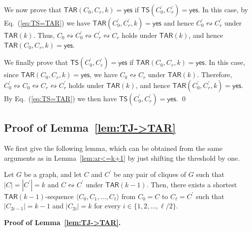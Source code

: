\documentclass{llncs}
\newcommand{\sevstep}{\leftrightsquigarrow}
\newcommand{\TAR}[1]{\mathsf{TAR}(#1)}
\newcommand{\ini}{0}
\newcommand{\tar}{r}
\newcommand{\cliq}{C}
\newcommand{\YES}{\mathsf{yes}}
\newcommand{\TARins}[3]{\mathsf{TAR}(#1,#2,#3)}
\newcommand{\TSins}[2]{\mathsf{TS}(#1,#2)}
\newcounter{one}
\begin{document}
	We now prove that $\TARins{\cliq_{\ini}}{\cliq_{\tar}}{k} = \YES$ if $\TSins{\cliq_{\ini}^\prime}{\cliq_{\tar}^\prime} = \YES$.
	In this case, by Eq.~(\ref{eq:TS=TAR}) we have $\TARins{\cliq_{\ini}^\prime}{\cliq_{\tar}^\prime}{k} = \YES$ and hence $\cliq_{\ini}^\prime \sevstep \cliq_{\tar}^\prime$ under $\TAR{k}$.
	Thus, $\cliq_{\ini} \sevstep \cliq_{\ini}^\prime \sevstep \cliq_{\tar}^\prime \sevstep \cliq_{\tar}$ holds under $\TAR{k}$, and hence $\TARins{\cliq_{\ini}}{\cliq_{\tar}}{k} = \YES$. 
	
	We finally prove that $\TSins{\cliq_{\ini}^\prime}{\cliq_{\tar}^\prime} = \YES$ if $\TARins{\cliq_{\ini}}{\cliq_{\tar}}{k} = \YES$.
	In this case, since $\TARins{\cliq_{\ini}}{\cliq_{\tar}}{k} = \YES$, we have $\cliq_{\ini} \sevstep \cliq_{\tar}$ under $\TAR{k}$.
	Therefore, $\cliq_{\ini}^\prime \sevstep \cliq_{\ini} \sevstep \cliq_{\tar} \sevstep \cliq_{\tar}^\prime$ holds under $\TAR{k}$, and hence $\TARins{\cliq_{\ini}^\prime}{\cliq_{\tar}^\prime}{k} = \YES$. 
	By Eq.~(\ref{eq:TS=TAR}) we then have $\TSins{\cliq_{\ini}^\prime}{\cliq_{\tar}^\prime} = \YES$.
\qed





	\subsection{Proof of Lemma~\ref{lem:TJ->TAR}}
	
	We first give the following lemma, which can be obtained from the same arguments as in Lemma~\ref{lem:ar<=k+1} by just shifting the threshold by one.	
	\begin{lemma} \label{lem:ar<=k}
	Let $G$ be a graph, and let $\cliq$ and $\cliq^\prime$ be any pair of cliques of $G$ such that $|\cliq| = |\cliq^\prime| = k$ and $\cliq \sevstep \cliq^\prime$ under $\TAR{k-1}$.
	Then, there exists a shortest $\TAR{k-1}$-sequence $\langle \cliq_{0}, \cliq_{1}, \dots, \cliq_{\ell} \rangle$ from $\cliq_{0} = \cliq$ to $\cliq_{\ell} = \cliq^\prime$ such that $|\cliq_{2i-1}| = k-1$ and $|\cliq_{2i}| = k$ for every $i \in \{1, 2, \ldots, \ell/2 \}$.
	\end{lemma}


	\noindent
	{\bf Proof of Lemma~\ref{lem:TJ->TAR}.}
\end{document}
